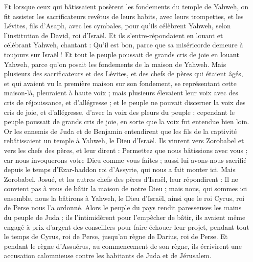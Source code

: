 \begin{multicols}{2}
Et lorsque ceux qui bâtissaient posèrent les fondements du temple de Yahweh, on fit assister les sacrificateurs revêtus de leurs habits, avec leurs trompettes, et les Lévites, fils d'Asaph, avec les cymbales, pour qu’ils célèbrent Yahweh, selon l’institution de David, roi d'Israël.
Et ils s'entre-répondaient en louant et célébrant Yahweh, chantant : Qu'il est bon, parce que sa miséricorde demeure à toujours sur Israël ! Et tout le peuple poussait de grands cris de joie en louant Yahweh, parce qu'on posait les fondements de la maison de Yahweh.
Mais plusieurs des sacrificateurs et des Lévites, et des chefs de pères qui étaient âgés, et qui avaient vu la première maison sur son fondement, se représentant cette maison-là, pleuraient à haute voix ; mais plusieurs élevaient leur voix avec des cris de réjouissance, et d’allégresse ;
et le peuple ne pouvait discerner la voix des cris de joie, et d’allégresse, d’avec la voix des pleurs du peuple ; cependant le peuple poussait de grands cris de joie, en sorte que la voix fut entendue bien loin.
\VerseOne{}Or les ennemis de Juda et de Benjamin entendirent que les fils de la captivité rebâtissaient un temple à Yahweh, le Dieu d'Israël.
Ils vinrent vers Zorobabel et vers les chefs des pères, et leur dirent : Permettez que nous bâtissions avec vous ; car nous invoquerons votre Dieu comme vous faites ; aussi lui avons-nous sacrifié depuis le temps d’Ezar-haddon roi d’Assyrie, qui nous a fait monter ici.
Mais Zorobabel, Josué, et les autres chefs des pères d'Israël, leur répondirent : Il ne convient pas à vous de bâtir la maison de notre Dieu ; mais nous, qui sommes ici ensemble, nous la bâtirons à Yahweh, le Dieu d'Israël, ainsi que le roi Cyrus, roi de Perse nous l'a ordonné.
Alors le peuple du pays rendit paresseuses les mains du peuple de Juda ; ils l’intimidèrent pour l'empêcher de bâtir,
ils avaient même engagé à prix d’argent des conseillers pour faire échouer leur projet, pendant tout le temps de Cyrus, roi de Perse, jusqu'au règne de Darius, roi de Perse.
Et pendant le règne d'Assuérus, au commencement de son règne, ils écrivirent une accusation calomnieuse contre les habitants de Juda et de Jérusalem.

\end{multicols}
